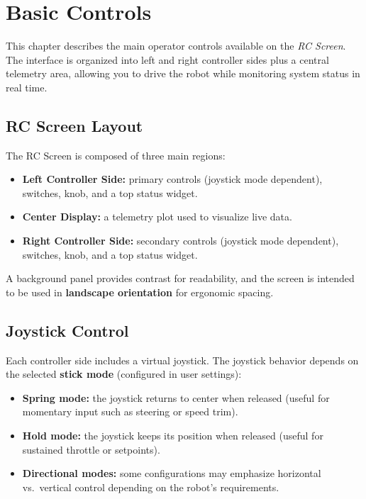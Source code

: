 \chapter{Basic Controls}
\label{ch:basic-controls}

This chapter describes the main operator controls available on the \textit{RC Screen}. The interface is organized into left and right controller sides plus a central telemetry area, allowing you to drive the robot while monitoring system status in real time.

\section{RC Screen Layout}
\label{sec:rc-layout}

The RC Screen is composed of three main regions:

\begin{itemize}
    \item \textbf{Left Controller Side:} primary controls (joystick mode dependent), switches, knob, and a top status widget.
    \item \textbf{Center Display:} a telemetry plot used to visualize live data.
    \item \textbf{Right Controller Side:} secondary controls (joystick mode dependent), switches, knob, and a top status widget.
\end{itemize}

A background panel provides contrast for readability, and the screen is intended to be used in \textbf{landscape orientation} for ergonomic spacing.

\section{Joystick Control}
\label{sec:joystick-control}

Each controller side includes a virtual joystick. The joystick behavior depends on the selected \textbf{stick mode} (configured in user settings):

\begin{itemize}
    \item \textbf{Spring mode:} the joystick returns to center when released (useful for momentary input such as steering or speed trim).
    \item \textbf{Hold mode:} the joystick keeps its position when released (useful for sustained throttle or setpoints).
    \item \textbf{Directional modes:} some configurations may emphasize horizontal vs.\ vertical control depending on the robot's requirements.
\end{itemize}

